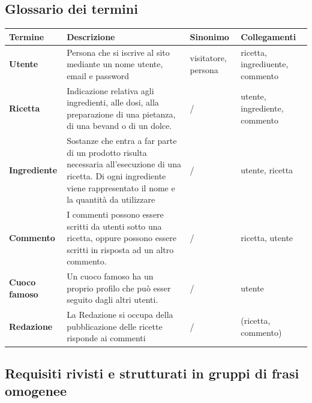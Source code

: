\documentclass[12pt]{extarticle}
\begin{document}
\newpage

\subsection{Glossario dei termini}
\vspace{2cm}
    \begin{tabularx}{\textwidth}{X|X|X|X}
    \bfseries Termine      & \bfseries Descrizione  & \bfseries Sinonimo  & \bfseries Collegamenti\\ 
    \hline\hline
    \bfseries Utente       & Persona che si iscrive al sito mediante un nome utente, email e password                                                                                                            & visitatore, persona & ricetta, ingrediuente, commento \\ 
    \hline
    \bfseries Ricetta      & Indicazione relativa agli ingredienti, alle dosi, alla preparazione di una pietanza, di una bevand o di un dolce.                                                              & /                   & utente, ingrediente, commento   \\
    \hline
    \bfseries Ingrediente  & Sostanze che entra a far parte di un prodotto  risulta necessaria all'esecuzione di una ricetta. Di ogni ingrediente viene rappresentato  il nome e la quantità da utilizzare & /                   & utente, ricetta                 \\
    \hline
    \bfseries Commento     & I commenti possono essere scritti da utenti sotto una ricetta, oppure possono essere scritti in risposta ad un altro commento.                                                     & /                   & ricetta, utente                 \\
    \hline
    \bfseries Cuoco famoso & Un cuoco famoso ha un proprio profilo che può esser seguito dagli altri utenti.                                                                                                      & /                   & utente                          \\
    \hline
    \bfseries Redazione    & La Redazione si occupa della pubblicazione delle ricette  risponde ai commenti                                                                                                        & /                   & (ricetta, commento)             \\
    \end{tabularx}

\newpage

\subsection{Requisiti rivisti e strutturati in gruppi di frasi omogenee}
\end{document}
